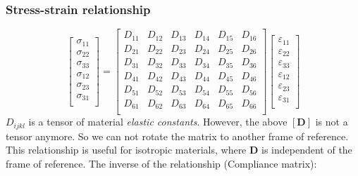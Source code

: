 \documentclass[notes]{beamer}
\begin{document}
\begin{frame}
\frametitle{Stress-strain relationship}
\begin{equation*}
\begin{bmatrix}
	\sigma_{11} \\
	\sigma_{22} \\
	\sigma_{33} \\
	\sigma_{12} \\
	\sigma_{23} \\
	\sigma_{31} \\
\end{bmatrix} %
= %
\begin{bmatrix}
	D_{11} & D_{12} & D_{13} & D_{14} &   D_{15} & D_{16}\\
	D_{21} & D_{22} & D_{23} & D_{24} &   D_{25} & D_{26}\\
	D_{31} & D_{32} & D_{33} & D_{34} &   D_{35} & D_{36}\\
	D_{41} & D_{42} & D_{43} & D_{44} &   D_{45} & D_{46}\\
	D_{51} & D_{52} & D_{53} & D_{54} &   D_{55} & D_{56}\\
	D_{61} & D_{62} & D_{63} & D_{64} &   D_{65} & D_{66}\\
\end{bmatrix} %
\begin{bmatrix}
\varepsilon_{11} \\
\varepsilon_{22} \\
\varepsilon_{33} \\
\varepsilon_{12} \\
\varepsilon_{23} \\
\varepsilon_{31} \\
\end{bmatrix}
\end{equation*}
$D_{ijkl}$ is a tensor of material \textit{elastic constants}. However, the above $[\mathbf{D}]$ is not a tensor anymore. So we can not rotate the matrix to another frame of reference. This relationship is useful for isotropic materials, where $\mathbf{D}$ is independent of the frame of reference. 
The inverse of the relationship (Compliance matrix): 
\end{frame}
\end{document}
